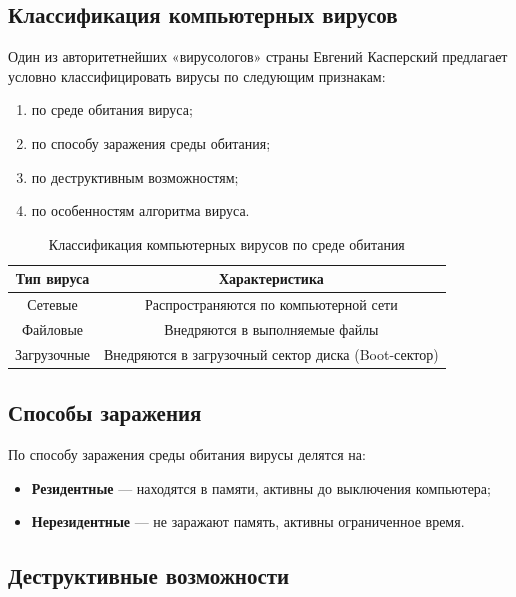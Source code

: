 \subsection{Классификация компьютерных вирусов}
 
Один из авторитетнейших «вирусологов» страны Евгений Касперский предлагает условно классифицировать вирусы по следующим признакам:
 
\begin{enumerate}
    \item по среде обитания вируса;
    \item по способу заражения среды обитания;
    \item по деструктивным возможностям;
    \item по особенностям алгоритма вируса.
\end{enumerate}
 
\begin{table}[h]
    \centering
    \caption{Классификация компьютерных вирусов по среде обитания}
    \label{tab:classification}
    \begin{tabular}{|c|c|}
        \hline
        \textbf{Тип вируса} & \textbf{Характеристика} \\
        \hline
        Сетевые & Распространяются по компьютерной сети \\
        Файловые & Внедряются в выполняемые файлы \\
        Загрузочные & Внедряются в загрузочный сектор диска (Boot-сектор) \\
        \hline
    \end{tabular}
\end{table}
 
\subsection{Способы заражения}
 
По способу заражения среды обитания вирусы делятся на:
 
\begin{itemize}
    \item \textbf{Резидентные} — находятся в памяти, активны до выключения компьютера;
    \item \textbf{Нерезидентные} — не заражают память, активны ограниченное время.
\end{itemize}
 
\subsection{Деструктивные возможности}
 
